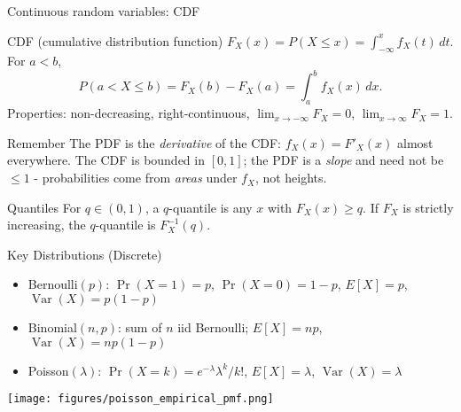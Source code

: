 \documentclass[aspectratio=43]{beamer}
\def\textemdash{-}%
\def\P{P}%
\def\mathbb#1{#1}%
\renewcommand{\P}{\mathbb{P}}
\newcommand{\1}{\mathbf{1}}
\begin{document}
\begin{frame}{Continuous random variables: CDF}{}
  {\small
  \begin{block}{CDF (cumulative distribution function)}
    $F_X(x)=\P(X\le x)=\int_{-\infty}^{x} f_X(t)\,dt$. For $a<b$,
    {\scriptsize\[
      \P(a< X\le b)=F_X(b)-F_X(a)=\int_a^b f_X(x)\,dx.
    \]}
    Properties: non-decreasing, right-continuous, $\lim_{x\to-\infty}F_X=0$, $\lim_{x\to\infty}F_X=1$.
  \end{block}
  \vspace{-0.5em}
  \begin{alertblock}{Remember}
  The PDF is the \emph{derivative} of the CDF: $f_X(x)=F'_X(x)$ almost everywhere. The CDF is bounded in $[0,1]$; the PDF is a \emph{slope} and need not be $\le 1$ \textemdash{} probabilities come from \emph{areas} under $f_X$, not heights.
  \end{alertblock}
  \vspace{-0.5em}
  \begin{block}{Quantiles}
    For $q\in(0,1)$, a $q$-quantile is any $x$ with $F_X(x)\ge q$. If $F_X$ is strictly increasing, the $q$-quantile is $F_X^{-1}(q)$.
  \end{block}
  }
\end{frame}

\begin{frame}{Key Distributions (Discrete)}
  \begin{itemize}
    \item Bernoulli$(p)$: $\Pr(X=1)=p$, $\Pr(X=0)=1-p$, $\mathbb{E}[X]=p$, $\operatorname{Var}(X)=p(1-p)$
    \item Binomial$(n,p)$: sum of $n$ iid Bernoulli; $\mathbb{E}[X]=np$, $\operatorname{Var}(X)=np(1-p)$
    \item Poisson$(\lambda)$: $\Pr(X=k)=e^{-\lambda}\lambda^k/k!$, $\mathbb{E}[X]=\lambda$, $\operatorname{Var}(X)=\lambda$
  \end{itemize}
  \begin{center}
    \texttt{[image: figures/poisson\_empirical\_pmf.png]}
  \end{center}
\end{frame}
\end{document}
